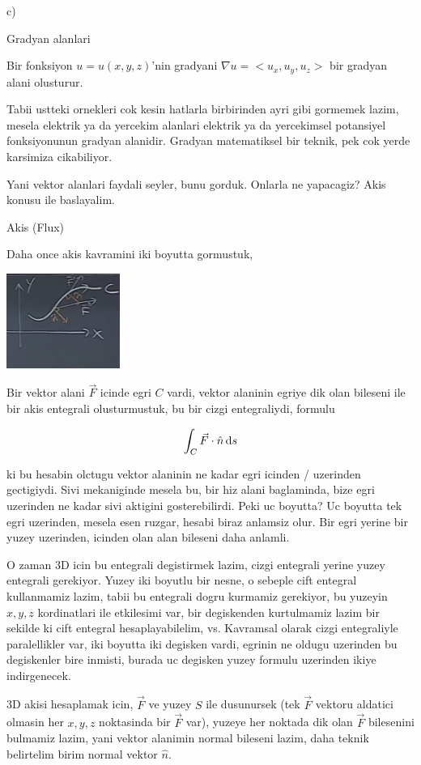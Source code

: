 \documentclass[12pt,fleqn]{article}\usepackage{../../common}
\begin{document}
c)

Gradyan alanlari

Bir fonksiyon $u = u(x,y,z)$'nin gradyani $\nabla u = < u_x, u_y, u_z >$
bir gradyan alani olusturur.

Tabii ustteki ornekleri cok kesin hatlarla birbirinden ayri gibi gormemek lazim,
mesela elektrik ya da yercekim alanlari elektrik ya da yercekimsel potansiyel
fonksiyonunun gradyan alanidir. Gradyan matematiksel bir teknik, pek cok
yerde karsimiza cikabiliyor.

Yani vektor alanlari faydali seyler, bunu gorduk. Onlarla ne yapacagiz?
Akis konusu ile baslayalim.

Akis (Flux)

Daha once akis kavramini iki boyutta gormustuk,

\includegraphics[width=10em]{calc_multi_27_02.png}

Bir vektor alani $\vec{F}$ icinde egri $C$ vardi, vektor alaninin
egriye dik olan bileseni ile bir akis entegrali olusturmustuk, bu
bir cizgi entegraliydi, formulu

$$
\int_C \vec{F} \cdot \hat{n} \,\mathrm{d} s
$$

ki bu hesabin olctugu vektor alaninin ne kadar egri icinden / uzerinden
gectigiydi. Sivi mekaniginde mesela bu, bir hiz alani baglaminda, bize egri
uzerinden ne kadar sivi aktigini gosterebilirdi. Peki uc boyutta? Uc boyutta tek
egri uzerinden, mesela esen ruzgar, hesabi biraz anlamsiz olur. Bir egri yerine
bir yuzey uzerinden, icinden olan alan bileseni daha anlamli.

O zaman 3D icin bu entegrali degistirmek lazim, cizgi entegrali yerine yuzey
entegrali gerekiyor.  Yuzey iki boyutlu bir nesne, o sebeple cift entegral
kullanmamiz lazim, tabii bu entegrali dogru kurmamiz gerekiyor, bu yuzeyin
$x,y,z$ kordinatlari ile etkilesimi var, bir degiskenden kurtulmamiz lazim bir
sekilde ki cift entegral hesaplayabilelim, vs. Kavramsal olarak cizgi
entegraliyle paralellikler var, iki boyutta iki degisken vardi, egrinin ne
oldugu uzerinden bu degiskenler bire inmisti, burada uc degisken yuzey formulu
uzerinden ikiye indirgenecek.

3D akisi hesaplamak icin, $\vec{F}$ ve yuzey $S$ ile dusunursek (tek $\vec{F}$
vektoru aldatici olmasin her $x,y,z$ noktasinda bir $\vec{F}$ var), yuzeye
her noktada dik olan $\vec{F}$ bilesenini bulmamiz lazim, yani vektor alanimin
normal bileseni lazim, daha teknik belirtelim birim normal vektor $\hat{n}$.
\end{document}
